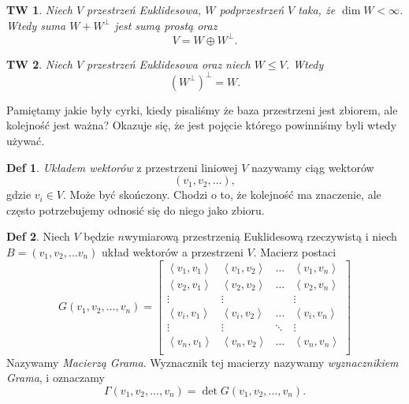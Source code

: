 \documentclass[a4paper, 12pt]{mwart}
\theoremstyle{definition}
\newtheorem{definicja}{Def}[section]
\theoremstyle{plain}
\newtheorem{twierdzenie}{TW}[section]
\theoremstyle{remark}
\begin{document}
\begin{twierdzenie}
	Niech $V$ \ppauza przestrzeń Euklidesowa, $W$ \ppauza podprzestrzeń $V$ taka, że $\dim W < \infty$. Wtedy suma $W + W^\perp$ jest sumą prostą oraz
	\begin{equation}
		V = W \oplus W^\perp.
	\end{equation}
\end{twierdzenie}
\begin{twierdzenie}
	Niech $V$ \ppauza przestrzeń Euklidesowa oraz niech $W \leq V$. Wtedy
	\begin{equation}
		{(W^\perp)}^\perp = W.
	\end{equation}
\end{twierdzenie}
Pamiętamy jakie były cyrki, kiedy pisaliśmy że baza przestrzeni jest zbiorem, ale kolejność jest ważna? Okazuje się, że jest pojęcie którego powinniśmy byli wtedy używać.
\begin{definicja}
	\emph{Układem wektorów} z przestrzeni liniowej $V$ nazywamy ciąg wektorów
	\begin{equation}
		\left(v_1, v_2, \ldots\right),
	\end{equation}
	gdzie $v_i \in V$. Może być skończony. Chodzi o to, że kolejność ma znaczenie, ale często potrzebujemy odnosić się do niego jako zbioru.
\end{definicja}
\begin{definicja}
	Niech $V$ będzie $n$\ppauza wymiarową przestrzenią Euklidesową rzeczywistą i niech $B = (v_1, v_2, \ldots v_n)$ \ppauza układ wektorów a przestrzeni $V$. Macierz postaci
	\begin{equation}
		G(v_1, v_2, \dots, v_n) = \begin{bmatrix}
			\left<v_1, v_1\right> & \left<v_1, v_2\right> & \ldots & \left<v_1, v_n\right> \\
			\left<v_2, v_1\right> & \left<v_2, v_2\right> & \ldots & \left<v_2, v_n\right> \\
			\vdots & \vdots & & \vdots \\
			\left<v_i, v_1\right> & \left<v_i, v_2\right> & \ldots & \left<v_i, v_n\right> \\
			\vdots & \vdots & \ddots & \vdots \\
			\left<v_n, v_1\right> & \left<v_n, v_2\right> & \ldots & \left<v_n, v_n\right> \\
		\end{bmatrix}
	\end{equation}
	Nazywamy \emph{Macierzą Grama}. Wyznacznik tej macierzy nazywamy \emph{wyznacznikiem Grama}, i oznaczamy
	\begin{equation}
		\Gamma(v_1, v_2, \ldots, v_n) = \det G(v_1, v_2, \dots, v_n).
	\end{equation}
\end{definicja}
\end{document}
